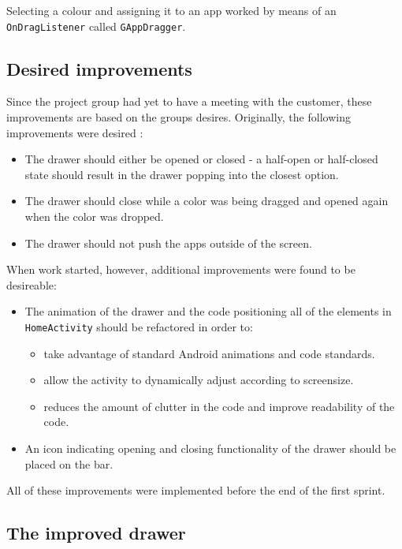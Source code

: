 Selecting a colour and assigning it to an app worked by means of an \lstinline{OnDragListener} called \lstinline{GAppDragger}.

\subsection{Desired improvements}

Since the project group had yet to have a meeting with the customer, these improvements are based on the groups desires.
Originally, the following improvements were desired :

\begin{itemize}
\item The drawer should either be opened or closed - a half-open or half-closed state should result in the drawer popping into the closest option.
\item The drawer should close while a color was being dragged and opened again when the color was dropped.
\item The drawer should not push the apps outside of the screen.
\end{itemize}

When work started, however, additional improvements were found to be desireable:

\begin{itemize}
\item The animation of the drawer and the code positioning all of the elements in \lstinline{HomeActivity} should be refactored in order to:
\begin{itemize}
\item take advantage of standard Android animations and code standards.
\item allow the activity to dynamically adjust according to screensize.
\item reduces the amount of clutter in the code and improve readability of the code.
\end{itemize}
\item An icon indicating opening and closing functionality of the drawer should be placed on the bar.
\end{itemize}

All of these improvements were implemented before the end of the first sprint. 

\subsection{The improved drawer}

